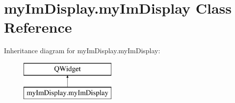 \hypertarget{classmyImDisplay_1_1myImDisplay}{\section{my\-Im\-Display.\-my\-Im\-Display Class Reference}
\label{classmyImDisplay_1_1myImDisplay}
}
Inheritance diagram for my\-Im\-Display.\-my\-Im\-Display\-:\begin{figure}[H]
\begin{center}
\leavevmode
\includegraphics[height=2.000000cm]{classmyImDisplay_1_1myImDisplay}
\end{center}
\end{figure}
